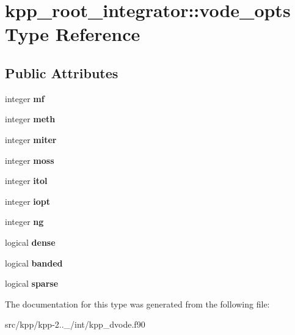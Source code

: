 \hypertarget{structkpp__root__integrator_1_1vode__opts}{}\section{kpp\+\_\+root\+\_\+integrator\+:\+:vode\+\_\+opts Type Reference}
\label{structkpp__root__integrator_1_1vode__opts}
\subsection*{Public Attributes}
\begin{DoxyCompactItemize}
\item 
\mbox{\label{structkpp__root__integrator_1_1vode__opts_a01b9ddd178085cfc49bce303820f2946}} 
integer {\bfseries mf}
\item 
\mbox{\label{structkpp__root__integrator_1_1vode__opts_abaf10dce25ae792e28833309317c568b}} 
integer {\bfseries meth}
\item 
\mbox{\label{structkpp__root__integrator_1_1vode__opts_a7a4621182f5e2c5acaa92aabc2ef369f}} 
integer {\bfseries miter}
\item 
\mbox{\label{structkpp__root__integrator_1_1vode__opts_a22a21f9344e923d305c741dac47d4e0f}} 
integer {\bfseries moss}
\item 
\mbox{\label{structkpp__root__integrator_1_1vode__opts_a018776c4b41c73d21ca255515a9c02a0}} 
integer {\bfseries itol}
\item 
\mbox{\label{structkpp__root__integrator_1_1vode__opts_aa5475a377555c10361220f1b4b778173}} 
integer {\bfseries iopt}
\item 
\mbox{\label{structkpp__root__integrator_1_1vode__opts_a3507c2c9bf42c27a504e1bfb6692d23f}} 
integer {\bfseries ng}
\item 
\mbox{\label{structkpp__root__integrator_1_1vode__opts_aaf94bddac2f0a7443a2886ebba3b7ee8}} 
logical {\bfseries dense}
\item 
\mbox{\label{structkpp__root__integrator_1_1vode__opts_a0298dbc31edd30a060083dcbf7485883}} 
logical {\bfseries banded}
\item 
\mbox{\label{structkpp__root__integrator_1_1vode__opts_a38d0a1b280654b6401e98354640def0e}} 
logical {\bfseries sparse}
\end{DoxyCompactItemize}


The documentation for this type was generated from the following file\+:\begin{DoxyCompactItemize}
\item 
src/kpp/kpp-\/2..\+\_/int/kpp\+\_\+dvode.\+f90\end{DoxyCompactItemize}
